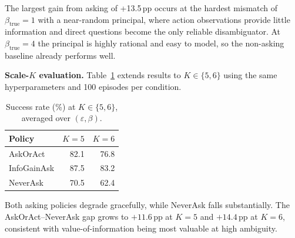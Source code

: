 \documentclass[10pt,twocolumn]{article}
\begin{document}
The largest gain from asking of +13.5\,pp occurs at the hardest mismatch of $\beta_{\text{true}}{=}1$ with a near-random principal, where action observations provide little information and direct questions become the only reliable disambiguator.
At $\beta_{\text{true}}{=}4$ the principal is highly rational and easy to model, so the non-asking baseline already performs well.

\textbf{Scale-$K$ evaluation.}
Table~\ref{tab:scalek} extends results to $K \in \{5,6\}$ using the same hyperparameters and 100 episodes per condition.

\begin{table}[h]
\centering
\caption{Success rate (\%) at $K{\in}\{5,6\}$, averaged over $(\varepsilon,\beta)$.}
\label{tab:scalek}
\small
\begin{tabular}{lrr}
\toprule
Policy & $K{=}5$ & $K{=}6$ \\
\midrule
AskOrAct  & 82.1 & 76.8 \\
InfoGainAsk & 87.5 & 83.2 \\
NeverAsk  & 70.5 & 62.4 \\
\bottomrule
\end{tabular}
\end{table}

Both asking policies degrade gracefully, while NeverAsk falls substantially.
The AskOrAct--NeverAsk gap grows to $+11.6$\,pp at $K{=}5$ and $+14.4$\,pp at $K{=}6$, consistent with value-of-information being most valuable at high ambiguity.
\end{document}
